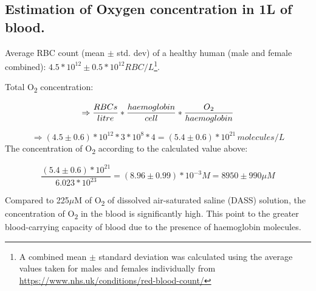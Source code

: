 \documentclass[pdflatex,sn-mathphys]{sn-jnl}%
\theoremstyle{thmstyleone}%
\theoremstyle{thmstyletwo}%
\theoremstyle{thmstylethree}%
\begin{document}
\subsection{Estimation of Oxygen concentration in 1L of blood.}
Average RBC count (mean $\pm$ std. dev) of a healthy human (male and female combined): \(4.5 * 10^{12} {\pm} 0.5 * 10^{12} RBC/L\)\footnote{A combined mean $\pm$ standard deviation was calculated using the average values taken for males and females individually from \href{https://www.nhs.uk/conditions/red-blood-count/}{https://www.nhs.uk/conditions/red-blood-count/}}.

Total O\textsubscript{2} concentration:

\[\Rightarrow\frac{RBCs}{litre} * \frac{haemoglobin}{cell} * \frac{O\textsubscript{2}}{haemoglobin}\]

\[\Rightarrow(4.5\pm 0.6) * 10^{12} * 3 * 10^{8} * 4 = (5.4\pm 0.6) * 10^{21}\,molecules/L\]
The concentration of O\textsubscript{2} according to the calculated value above:

\[\frac{(5.4\pm 0.6)*10^{21}}{6.023 * 10^{23}} = (8.96\pm0.99) * 10^{-3} M = 8950\pm990 {\mu}M\]\vspace{1mm}


Compared to 225$\mu$M of O\textsubscript{2} of dissolved air-saturated saline (DASS) solution, the concentration of O\textsubscript{2} in the blood is significantly high. This point to the greater blood-carrying capacity of blood due to the presence of haemoglobin molecules.
\end{document}
